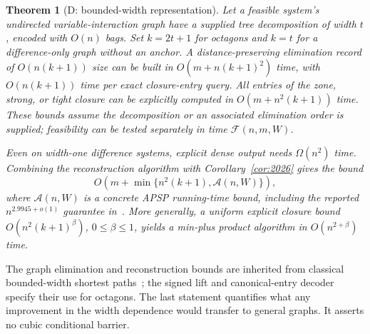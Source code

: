 \documentclass[manuscript,11pt,screen,nonacm]{acmart}
\newtheorem{theorem}{Theorem}[section]
\theoremstyle{definition}
\newcommand{\Ftime}{\mathcal F(n,m,W)}
\newcommand{\Atime}{\mathcal A(n,W)}
\begin{document}
\begin{theorem}[D: bounded-width representation]\label{thm:D}
Let a feasible system's undirected variable-interaction graph have a supplied tree decomposition of width $t$, encoded with $O(n)$ bags. Set $k=2t+1$ for octagons and $k=t$ for a difference-only graph without an anchor. A distance-preserving elimination record of $O(n(k+1))$ size can be built in $O(m+n(k+1)^2)$ time, with $O(n(k+1))$ time per exact closure-entry query. All entries of the zone, strong, or tight closure can be explicitly computed in $O(m+n^2(k+1))$ time. These bounds assume the decomposition or an associated elimination order is supplied; feasibility can be tested separately in time $\Ftime$.

Even on width-one difference systems, explicit dense output needs $\Omega(n^2)$ time. Combining the reconstruction algorithm with Corollary~\ref{cor:2026} gives the bound
\[
 O\!\left(m+\min\{n^2(k+1),\Atime\}\right),
\]
where $\Atime$ is a concrete APSP running-time bound, including the reported $n^{2.9945+o(1)}$ guarantee in~\cite{majdoddin2026}. More generally, a uniform explicit closure bound $O(n^2(k+1)^\beta)$, $0\leq\beta\leq1$, yields a min-plus product algorithm in $O(n^{2+\beta})$ time.
\end{theorem}
The graph elimination and reconstruction bounds are inherited from classical bounded-width shortest paths~\cite{planken2012}; the signed lift and canonical-entry decoder specify their use for octagons. The last statement quantifies what any improvement in the width dependence would transfer to general graphs. It asserts no cubic conditional barrier.
\end{document}

